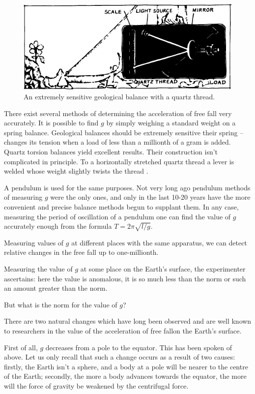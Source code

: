  \begin{figure}[!ht]
 \centering
 \includegraphics[width=\textwidth]{figures/fig-6-2.pdf}
 \caption{An extremely sensitive geological balance with a quartz thread.}
 \label{fig-6-2}
 \end{figure}

There exist several methods of determining the acceleration of free fall very accurately. It is possible to
find $g$ by simply weighing a standard weight on a spring balance. Geological balances should be extremely sensitive their spring -- changes its tension when a load of less than a millionth of a gram is added. Quartz torsion
balances yield excellent results. Their construction isn't
complicated in principle. To a horizontally stretched
quartz thread a lever is welded whose weight slightly
twists the thread .

A pendulum is used for the same purposes. Not very
long ago pendulum methods of measuring $g$ were the
only ones, and only in the last 10-20 years have the more
convenient and precise balance methods begun to supplant
them. In any case, measuring the period of oscillation
of a pendulum one can find the value of $g$ accurately enough from the formula $T = 2 \pi \sqrt{l/g}$.

Measuring values of $g$ at different places with the same
apparatus, we can detect relative changes in the free
fall up to one-millionth.

Measuring the value of $g$ at some place on the Earth's
surface, the experimenter ascertains: here the value is
anomalous, it is so much less than the norm or such an
amount greater than the norm.

But what is the norm for the value of $g$?

There are two natural changes which have long been
observed and are well known to researchers in the value
of the acceleration of free fallon the Earth's surface.

First of all, $g$ decreases from a pole to the equator.
This has been spoken of above. Let us only recall that
such a change occurs as a result of two causes: firstly,
the Earth isn't a sphere, and a body at a pole will be
nearer to the centre of the Earth; secondly, the more a body
advances towards the equator, the more will the force
of gravity be weakened by the centrifugal force.

